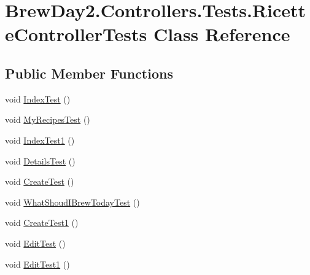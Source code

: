 \hypertarget{class_brew_day2_1_1_controllers_1_1_tests_1_1_ricette_controller_tests}{}\section{Brew\+Day2.\+Controllers.\+Tests.\+Ricette\+Controller\+Tests Class Reference}
\label{class_brew_day2_1_1_controllers_1_1_tests_1_1_ricette_controller_tests}
\subsection*{Public Member Functions}
\begin{DoxyCompactItemize}
\item 
void \mbox{\hyperlink{class_brew_day2_1_1_controllers_1_1_tests_1_1_ricette_controller_tests_a419c08c461715c8534103d1b11636268}{Index\+Test}} ()
\item 
void \mbox{\hyperlink{class_brew_day2_1_1_controllers_1_1_tests_1_1_ricette_controller_tests_acef68fcfd1539f0fad36f97fbf418f18}{My\+Recipes\+Test}} ()
\item 
void \mbox{\hyperlink{class_brew_day2_1_1_controllers_1_1_tests_1_1_ricette_controller_tests_adcf7224d97bcac761d4160fd671f2227}{Index\+Test1}} ()
\item 
void \mbox{\hyperlink{class_brew_day2_1_1_controllers_1_1_tests_1_1_ricette_controller_tests_a0aff50064398d2ac069563d4827fe7bd}{Details\+Test}} ()
\item 
void \mbox{\hyperlink{class_brew_day2_1_1_controllers_1_1_tests_1_1_ricette_controller_tests_a2dba241faa804485176a93d195099af6}{Create\+Test}} ()
\item 
void \mbox{\hyperlink{class_brew_day2_1_1_controllers_1_1_tests_1_1_ricette_controller_tests_ab83f22e42f72bb7cafd4f640e1c96767}{What\+Shoud\+I\+Brew\+Today\+Test}} ()
\item 
void \mbox{\hyperlink{class_brew_day2_1_1_controllers_1_1_tests_1_1_ricette_controller_tests_ac858c86ed6e9c3a66b21b0aad8875020}{Create\+Test1}} ()
\item 
void \mbox{\hyperlink{class_brew_day2_1_1_controllers_1_1_tests_1_1_ricette_controller_tests_a577164dc43aaac4d26d775a01580d31d}{Edit\+Test}} ()
\item 
void \mbox{\hyperlink{class_brew_day2_1_1_controllers_1_1_tests_1_1_ricette_controller_tests_af09a7b7f6b822f1581bc51bbd1ea8c46}{Edit\+Test1}} ()
\item 

\end{DoxyCompactItemize}
